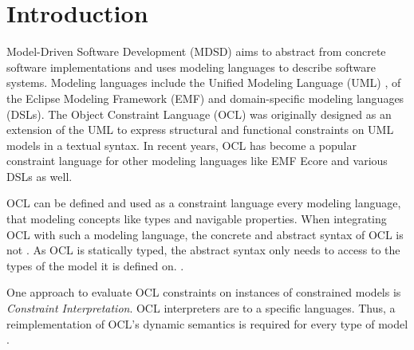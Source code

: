 \section{Introduction}

Model-Driven Software Development (MDSD) aims to abstract from concrete 
software implementations and uses modeling languages to describe 
software systems. Modeling languages include the Unified Modeling Language 
(UML) \cite{spec:UML2-2},  of the
Eclipse Modeling Framework (EMF) \cite{WWW:EMF} and domain-specific modeling languages (DSLs). The Object 
Constraint Language (OCL) \cite{spec:OCL2-2} was originally designed as 
an extension of the UML to express structural and functional constraints 
on UML models in a textual syntax. In recent years, OCL has become a 
popular constraint language for other modeling languages like EMF Ecore 
and various DSLs as well. 

OCL can be
defined and used as a constraint language  every modeling language, that  modeling concepts like types and navigable properties.
When integrating OCL with such a modeling language, the concrete and 
abstract syntax of OCL is not . As OCL is statically
typed, the abstract syntax only needs to access to the types of the model 
it is defined on. \cite{braeuerOCL07}.

One approach to evaluate 
OCL constraints on instances 
of constrained models is \textit{Constraint Interpretation}. 
OCL interpreters are  to a specific
 languages. Thus, a
reimplementation of OCL's dynamic semantics is required for every type of 
model . 

